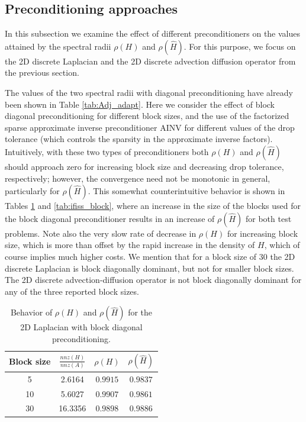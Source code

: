 \documentclass[times]{nlaauth}
\begin{document}
\subsection{Preconditioning approaches}

In this subsection we examine the effect of different preconditioners
on the values attained by the spectral radii $\rho(H)$ and $\rho(\hat{H})$.
For this purpose, we focus on the 2D discrete Laplacian and the
2D discrete advection
diffusion operator from the previous section.

The values of the two spectral radii with
diagonal preconditioning have already been shown in Table
\ref{tab:Adj_adapt}.
Here we consider the effect of
block diagonal preconditioning for different block sizes,
and the use of the factorized sparse approximate inverse
preconditioner AINV \cite{BMT1996,BT1998}
for different values of the drop tolerance (which controls the
sparsity in the approximate inverse factors).
Intuitively, with these two types of preconditioners both $\rho(H)$ and $\rho(\hat{H})$
should approach zero for increasing block size and decreasing
drop tolerance, respectively; however, the convergence need
not be monotonic in general, particularly for $\rho(\hat{H})$.
This somewhat counterintuitive
behavior is shown in Tables \ref{tab:lap2d_block} and \ref{tab:ifiss_block},
where an increase in the size of the blocks used for the block diagonal
preconditioner results in an increase of $\rho(\hat{H})$ for both test problems.
Note also the very slow rate of decrease in $\rho(H)$ for increasing block
size, which is more than offset by the rapid increase in the density of $H$,
which of course implies much higher costs.
We mention that for a block size of 30 the 2D discrete Laplacian is
block diagonally dominant, but not for smaller block sizes. The 2D
discrete advection-diffusion operator is not block diagonally dominant
for any of the three reported block sizes.


\begin{table}[!t]
\centering
\begin{tabular}{|c|c|c|c|}
\hline
\textbf{Block size} & \textbf{$\frac{nnz(H)}{nnz(A)}$}& $\rho(H)$
&$\rho(\hat{H})$\\
\hline
 5 & 2.6164 & $0.9915$ & $0.9837$\\
\hline
 10 & 5.6027 & $0.9907$ & $0.9861$\\
\hline
 30 & 16.3356 & $0.9898$  & $0.9886$\\
\hline
\end{tabular}
\caption{Behavior of $\rho(H)$ and $\rho(\hat{H})$ for the
2D Laplacian with block diagonal preconditioning.}
\label{tab:lap2d_block}
\end{table}
\end{document}
